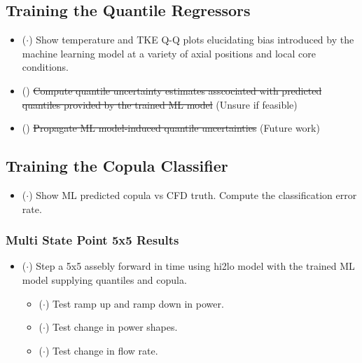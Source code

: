 \subsection{Training the Quantile Regressors}

\begin{itemize}
    \item ($\cdot$) Show temperature and TKE Q-Q plots elucidating bias introduced by the machine learning model at a variety of axial positions and local core conditions.
    \item (\xmark) \sout{Compute quantile uncertainty estimates asscociated with predicted quantiles provided by the trained ML model} (Unsure if feasible)
    \item (\xmark) \sout{Propagate ML model-induced quantile uncertainties} (Future work)
\end{itemize}

\subsection{Training the Copula Classifier}

\begin{itemize}
    \item ($\cdot$)  Show ML predicted copula vs CFD truth.  Compute the classification error rate.
\end{itemize}

\subsubsection{Multi State Point 5x5 Results}

\begin{itemize}
    \item ($\cdot$) Step a 5x5 assebly forward in time using hi2lo model with the trained ML model supplying quantiles and copula.
    \begin{itemize}
        \item ($\cdot$) Test ramp up and ramp down in power.
        \item ($\cdot$) Test change in power shapes.
        \item ($\cdot$) Test change in flow rate.
    \end{itemize}

\end{itemize}
